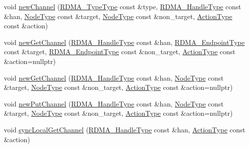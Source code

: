 \begin{DoxyCompactItemize}
\item 
void \hyperlink{structvt_1_1rdma_1_1_r_d_m_a_manager_add2a57acf8b38758b2e53f71d92d452a}{new\+Channel} (\hyperlink{namespacevt_1_1rdma_ac848e1d9da43db6294bd06f83e5d3946}{R\+D\+M\+A\+\_\+\+Type\+Type} const \&type, \hyperlink{namespacevt_a10442579ec4e7ebef223818e64bcf908}{R\+D\+M\+A\+\_\+\+Handle\+Type} const \&han, \hyperlink{namespacevt_a866da9d0efc19c0a1ce79e9e492f47e2}{Node\+Type} const \&target, \hyperlink{namespacevt_a866da9d0efc19c0a1ce79e9e492f47e2}{Node\+Type} const \&non\+\_\+target, \hyperlink{namespacevt_ae0a5a7b18cc99d7b732cb4d44f46b0f3}{Action\+Type} const \&action)
\item 
void \hyperlink{structvt_1_1rdma_1_1_r_d_m_a_manager_af300aa329bab5b4fe851025525659454}{new\+Get\+Channel} (\hyperlink{namespacevt_a10442579ec4e7ebef223818e64bcf908}{R\+D\+M\+A\+\_\+\+Handle\+Type} const \&han, \hyperlink{structvt_1_1rdma_1_1_r_d_m_a_manager_a106350721a187d2cfb94a9017ef66a07}{R\+D\+M\+A\+\_\+\+Endpoint\+Type} const \&target, \hyperlink{structvt_1_1rdma_1_1_r_d_m_a_manager_a106350721a187d2cfb94a9017ef66a07}{R\+D\+M\+A\+\_\+\+Endpoint\+Type} const \&non\+\_\+target, \hyperlink{namespacevt_ae0a5a7b18cc99d7b732cb4d44f46b0f3}{Action\+Type} const \&action=nullptr)
\item 
void \hyperlink{structvt_1_1rdma_1_1_r_d_m_a_manager_a6a3ecf9512915681304ccd0126ec531f}{new\+Get\+Channel} (\hyperlink{namespacevt_a10442579ec4e7ebef223818e64bcf908}{R\+D\+M\+A\+\_\+\+Handle\+Type} const \&han, \hyperlink{namespacevt_a866da9d0efc19c0a1ce79e9e492f47e2}{Node\+Type} const \&target, \hyperlink{namespacevt_a866da9d0efc19c0a1ce79e9e492f47e2}{Node\+Type} const \&non\+\_\+target, \hyperlink{namespacevt_ae0a5a7b18cc99d7b732cb4d44f46b0f3}{Action\+Type} const \&action=nullptr)
\item 
void \hyperlink{structvt_1_1rdma_1_1_r_d_m_a_manager_ae64c8e90dc45fcd44129e4c62f3b65ea}{new\+Put\+Channel} (\hyperlink{namespacevt_a10442579ec4e7ebef223818e64bcf908}{R\+D\+M\+A\+\_\+\+Handle\+Type} const \&han, \hyperlink{namespacevt_a866da9d0efc19c0a1ce79e9e492f47e2}{Node\+Type} const \&target, \hyperlink{namespacevt_a866da9d0efc19c0a1ce79e9e492f47e2}{Node\+Type} const \&non\+\_\+target, \hyperlink{namespacevt_ae0a5a7b18cc99d7b732cb4d44f46b0f3}{Action\+Type} const \&action=nullptr)
\item 
void \hyperlink{structvt_1_1rdma_1_1_r_d_m_a_manager_a85e3bd458484375b762492ed0d65d9f5}{sync\+Local\+Get\+Channel} (\hyperlink{namespacevt_a10442579ec4e7ebef223818e64bcf908}{R\+D\+M\+A\+\_\+\+Handle\+Type} const \&han, \hyperlink{namespacevt_ae0a5a7b18cc99d7b732cb4d44f46b0f3}{Action\+Type} const \&action)

\end{DoxyCompactItemize}
